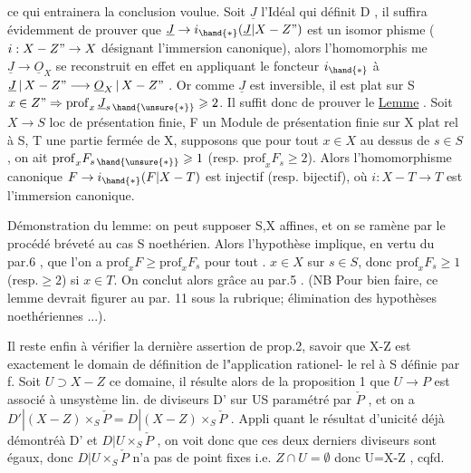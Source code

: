 
ce qui entrainera la conclusion voulue. Soit $\underline{J}$ l'Idéal qui définit
D , il suffira évidemment de prouver que $\underline{J}\to i_{\hand{*}}(\underline{J}|X-Z")$ est un isomor
phisme ($i:X-Z"\to X$ désignant l'immersion canonique), alors l'homomorphis
me $\underline{J}\to\underline{O}_X$ se reconstruit en effet en appliquant le foncteur $i_{\hand{*}}$ à
$\underline{J}\,|\,X-Z" \longrightarrow \underline{O}_X\,|\,X-Z"$ . Or comme $\underline{J}$ est inversible, il est plat sur S 
 $x\in Z" \Rightarrow \mathrm{prof}_x\,\underline{J}_{s\,\hand{\unsure{*}}} \geqslant 2$. Il suffit donc de prouver le
\uline{Lemme} . Soit $X\to S$ loc de présentation finie, F un Module de présentation
finie sur X plat rel à S, T une partie fermée de X, supposons que pour
tout $x\in X$ au dessus de $s\in S$, on ait \hand{\unsure{/}} $\mathrm{prof}_x F_{s\,\hand{\unsure{*}}}\geqslant 1$ (resp. $\mathrm{prof}_x F_s \geqslant 2$).
Alors l'homomorphisme canonique $F\to i_{\hand{*}}(F|X-T)$ est injectif (resp.
bijectif), où $i:X-T\to T$ est l'immersion canonique.

Démonstration du lemme: on peut supposer S,X affines, et on se
ramène par le procédé bréveté au cas S noethérien. Alors l'hypothèse
implique, en vertu du par.6 , que l'on a $\mathrm{prof}_x F \geqslant \mathrm{prof}_x F_s$ pour tout .
$x\in X$ sur $s\in S$, donc $\mathrm{prof}_x F_s \geqslant 1$ (resp.$\geqslant 2$) si $x\in T$. On conclut alors
grâce au par.5 . (NB Pour bien faire, ce lemme devrait figurer au par.
11 sous la rubrique; élimination des hypothèses noethériennes ...).

Il reste enfin à vérifier la dernière assertion de prop.2, savoir
que X-Z est exactement le domain de définition de l"application rationel-%
le rel à S définie par f. Soit $U\supset X-Z$ ce domaine, il résulte alors de
la proposition 1 que $U\longrightarrow P$ est associé à unsystème lin. de diviseurs
D' sur U\unsure{/}S paramétré par $\check{P}$ , et on a $D'|(X-Z)\times_S\check{P} = D|(X-Z)\times_S\check{P}$ . Appli
quant le résultat d'unicité \hand{(}déjà démontré\hand{)}à D' et $D|U\times_S\check{P}$ , on voit donc
que ces deux derniers diviseurs sont égaux, donc $D|U\times_S\check{P}$ n'a pas de
point fixes i.e. $Z\cap U=\emptyset$ donc U=X-Z , cqfd.

